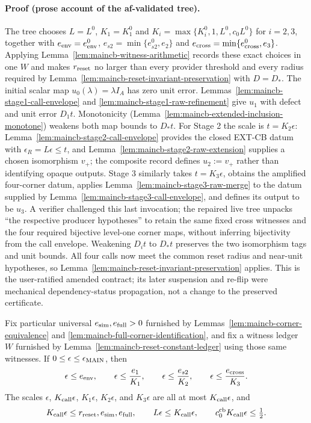 \paragraph{Proof (prose account of the af-validated tree).}
The tree chooses $L=L^0$, $K_1=K_1^0$ and
$K_i=\max\{K_i^0,1,L^0,c_0L^0\}$ for $i=2,3$, together with
$e_{\rm env}=e_{\rm env}^0$, $e_{s2}=\min\{e_{s2}^0,e_2\}$ and
$e_{\rm cross}=\min\{e_{\rm cross}^0,e_3\}$.  Applying
Lemma~\ref{lem:maincb-witness-arithmetic} records these exact choices in one $W$ and makes
$r_{\rm reset}$ no larger than every provider threshold and every radius required by
Lemma~\ref{lem:maincb-reset-invariant-preservation} with $D=D_*$.  The initial scalar map
$u_0(\lambda)=\lambda I_A$ has zero unit error.  Lemmas~\ref{lem:maincb-stage1-call-envelope} and \ref{lem:maincb-stage1-raw-refinement} give $u_1$ with defect and unit error $D_1t$.  Monotonicity
(Lemma~\ref{lem:maincb-extended-inclusion-monotone}) weakens both map bounds to $D_*t$.
For Stage 2 the scale is $t=K_2\epsilon$: Lemma~\ref{lem:maincb-stage2-call-envelope} provides the closed EXT-CB
datum with $\epsilon_R=L\epsilon\le t$, and Lemma~\ref{lem:maincb-stage2-raw-extension} supplies a chosen isomorphism
$v_+$; the composite record defines $u_2:=v_+$ rather than identifying opaque outputs.
Stage 3 similarly takes $t=K_3\epsilon$, obtains the amplified four-corner datum, applies Lemma~\ref{lem:maincb-stage3-raw-merge} to the datum supplied by Lemma~\ref{lem:maincb-stage3-call-envelope}, and defines its output to be $u_3$.  A verifier challenged this last invocation;
the repaired live tree unpacks ``the respective producer hypotheses'' to retain the same
fixed cross witnesses and the four required bijective level-one corner maps, without
inferring bijectivity from the call envelope.  Weakening $D_i t$ to $D_*t$ preserves the
two isomorphism tags and unit bounds.  All four calls now meet the common reset radius and
near-unit hypotheses, so Lemma~\ref{lem:maincb-reset-invariant-preservation} applies.
This is the user-ratified amended contract; its later suspension and re-flip were mechanical dependency-status propagation, not a change to the preserved certificate.

\begin{lemma}\label{lem:maincb-structural-domain-ledger}
Fix particular universal $e_{\rm sim},e_{\rm full}>0$ furnished by
Lemmas~\ref{lem:maincb-corner-equivalence} and
\ref{lem:maincb-full-corner-identification}, and fix a witness ledger $W$ furnished by
Lemma~\ref{lem:maincb-reset-constant-ledger} using those same witnesses.  If
$0\le\epsilon\le\epsilon_{\rm MAIN}$, then
\[
 \epsilon\le e_{\rm env},\qquad \epsilon\le\frac{e_1}{K_1},\qquad
 \epsilon\le\frac{e_{s2}}{K_2},\qquad \epsilon\le\frac{e_{\rm cross}}{K_3}.
\]
The scales $\epsilon$, $K_{\rm call}\epsilon$, $K_1\epsilon$, $K_2\epsilon$, and
$K_3\epsilon$ are all at most $K_{\rm call}\epsilon$, and
\[
 K_{\rm call}\epsilon\le r_{\rm reset},e_{\rm sim},e_{\rm full},
 \qquad L\epsilon\le K_{\rm call}\epsilon,
 \qquad c_0^{\rm cb}K_{\rm call}\epsilon\le\tfrac12.
\]
\end{lemma}

